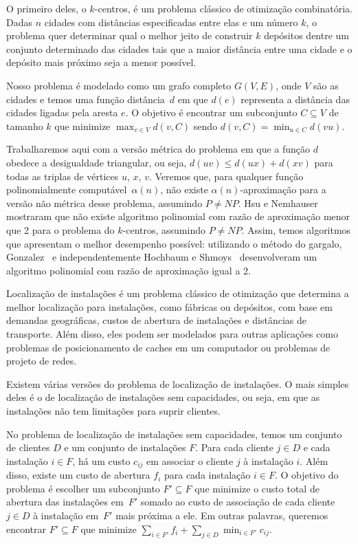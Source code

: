 \documentclass[12pt]{article}
\newcommand{\NP}{\mathit{NP}}
\begin{document}
O primeiro deles, o $k$-centros, é um problema clássico de otimização combinatória. Dadas $n$ cidades com distâncias especificadas entre elas e um número $k$, o problema quer determinar qual o melhor jeito de construir $k$ depósitos dentre um conjunto determinado das cidades tais que a maior distância entre uma cidade e o depósito mais próximo seja a menor possível.

Nosso problema é modelado como um grafo completo $G(V,E)$, onde $V$ são as cidades e temos uma função distância~$d$ em que $d(e)$ representa a distância das cidades ligadas pela aresta $e$. O objetivo é encontrar um subconjunto $C \subseteq V$ de tamanho $k$ que minimize $\max_{v\in V}d(v,C)$ sendo $d(v,C) = \min_{u\in C}d(vu)$.

Trabalharemos aqui com a versão métrica do problema em que a função $d$ obedece a desigualdade triangular, ou seja, $d(uv) \leq d(ux) + d(xv)$ para todas as triplas de vértices $u$, $x$, $v$. Veremos que, para qualquer função polinomialmente computável~$\alpha(n)$, não existe $\alpha(n)$-aproximação para a versão não métrica desse problema, assumindo $P\not=\NP$. Hsu e Nemhauser~\cite{HSU1979209} mostraram que não existe algoritmo polinomial com razão de aproximação menor que 2 para o problema do $k$-centros, assumindo $P\not=\NP$. Assim, temos algoritmos que apresentam o melhor desempenho possível: utilizando o método do gargalo, Gonzalez~\cite{GONZALEZ1985293} e independentemente Hochbaum e Shmoys~\cite{HochShmoys'85} desenvolveram um algoritmo polinomial com razão de aproximação igual a 2. 


Localização de instalações é um problema clássico de otimização que determina a melhor localização para instalações, como fábricas ou depósitos, com base em demandas geográficas, custos de abertura de instalações e distâncias de transporte. Além disso, eles podem ser modelados para outras aplicações como problemas de posicionamento de caches em um computador ou problemas de projeto de redes.

Existem várias versões do problema de localização de instalações. O mais simples deles é o de localização de instalações sem capacidades, ou seja, em que as instalações não tem limitações para suprir clientes.

No problema de localização de instalações sem capacidades, temos um conjunto de clientes $D$ e um conjunto de instalações $F$. Para cada cliente $j \in D$ e cada instalação $i \in F$, há um custo $c_{ij}$ em associar o cliente $j$ à instalação $i$. Além disso, existe um custo de abertura $f_i$ para cada instalação $i \in F$. O objetivo do problema é escolher um subconjunto $F' \subseteq F$ que minimize o custo total de abertura das instalações em~$F'$ somado ao custo de associação de cada cliente $j \in D$ à instalação em~$F'$ mais próxima a ele. Em outras palavras, queremos encontrar $F' \subseteq F$ que minimize $\sum_{i\in F'} f_i + \sum_{j \in D} \min_{i\in F'}c_{ij}$.
\end{document}
